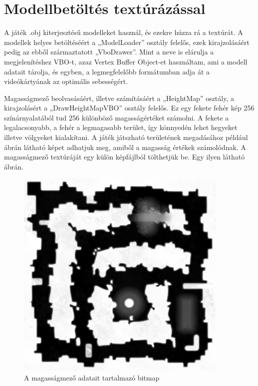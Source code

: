 
\section{Modellbetöltés textúrázással}

A játék .obj kiterjesztésű modelleket használ, és ezekre húzza rá a textúrát. A modellek helyes betöltéséért a „ModelLoader” osztály felelős, ezek kirajzolásáért pedig az ebből származtatott „VboDrawer”. Mint a neve is elárulja a megjelenítéshez VBO-t, azaz Vertex Buffer Object-et használtam, ami a modell adatait tárolja, és egyben, a legmegfelelőbb formátumban adja át a videókártyának az optimális sebességért.

Magasságmező beolvasásáért, illetve számításáért a „HeightMap” osztály, a kirajzolásért a „DrawHeightMapVBO” osztály felelős. Ez egy fekete fehér kép 256 színárnyalatából tud 256 különböző magasságértéket számolni. A fekete a legalacsonyabb, a fehér a legmagasabb terület, így könnyedén lehet hegyeket illetve völgyeket kialakítani. A játék játszható területének megadásához például  ábrán látható képet adhatjuk meg, amiből a magasság értékek számolódnak. A magasságmező textúráját egy külön képfájlból tölthetjük be. Egy ilyen látható  ábrán.

\begin{figure}[h]
\centering
\includegraphics[scale=0.7]{kepek/heightmap.png}
\caption{A magasságmező adatait tartalmazó bitmap}
\label{fig:heightmap}
\end{figure}

